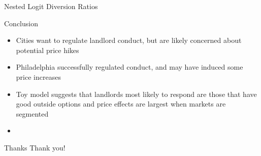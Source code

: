\documentclass[10pt, xcolor=dvipsnames]{beamer}
\begin{document}
\begin{frame}{Nested Logit Diversion Ratios}
    
\end{frame}

\begin{frame}{Conclusion}
    \begin{itemize}
        \item Cities want to regulate landlord conduct, but are likely concerned about potential price hikes
        \item Philadelphia successfully regulated conduct, and may have induced some price increases
        \item Toy model suggests that landlords most likely to respond are those that have good outside options and price effects are largest when markets are segmented
        \item 
    \end{itemize}
\end{frame}

\begin{frame}{Thanks}
    Thank you!
\end{frame}

    

    

    

    
    
\end{document}

